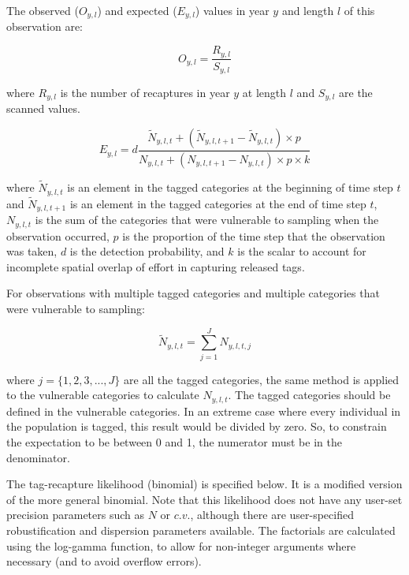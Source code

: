 The observed ($O_{y,l}$) and expected ($E_{y,l}$) values in year $y$ and length $l$ of this observation are:

\begin{equation}
O_{y,l} = \frac{R_{y,l}}{S_{y,l}}
\end{equation}

where $R_{y,l}$ is the number of recaptures in year $y$ at length $l$ and $S_{y,l}$ are the scanned values.

\begin{equation}
E_{y,l} = d \frac{\tilde{N}_{y,l,t} +  (\tilde{N}_{y,l,t + 1} - \tilde{N}_{y,l,t}) \times p}
{N_{y,l,t} + (N_{y,l,t+1} - N_{y,l,t}) \times p \times k}
\end{equation}

where $\tilde{N}_{y,l,t}$ is an element in the tagged categories at the beginning of time step $t$ and $\tilde{N}_{y,l,t + 1}$ is an element in the tagged categories at the end of time step $t$, $N_{y,l,t}$ is the sum of the categories that were vulnerable to sampling when the observation occurred, $p$ is the proportion of the time step that the observation was taken, $d$ is the detection probability, and $k$ is the scalar to account for incomplete spatial overlap of effort in capturing released tags.

For observations with multiple tagged categories and multiple categories that were vulnerable to sampling:

\begin{equation}
\tilde{N}_{y,l,t} = \sum_{j = 1}^{J} N_{y,l,t,j}
\end{equation}

where $j = \{1,2,3,...,J\}$  are all the tagged categories, the same method is applied to the vulnerable categories to calculate $N_{y,l,t}$. The tagged categories should be defined in the vulnerable categories. In an extreme case where every individual in the population is tagged, this result would be divided by zero. So, to constrain the expectation to be between 0 and 1, the numerator must be in the denominator.

The tag-recapture likelihood (binomial) is specified below. It is a modified version of the more general binomial. Note that this likelihood does not have any user-set precision parameters such as $N$ or $c.v.$, although there are user-specified robustification and dispersion parameters available. The factorials are calculated using the log-gamma function, to allow for non-integer arguments where necessary (and to avoid overflow errors).

